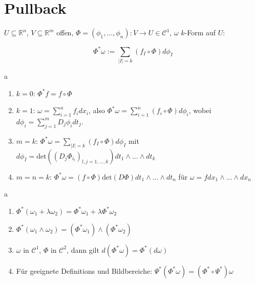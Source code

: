 \section{Pullback}
\begin{definition}[Pullback]
	$U\subseteq\mathbb R^n$, $V\subseteq\mathbb R^m$ offen, $\Phi = (\phi_1,\dots,\phi_n):V\rightarrow U \in \mathcal C^1$, $\omega$ $k$-Form auf $U$:

$$\Phi^*\omega := \sum_{|I|=k} (f_I\circ\Phi)d\phi_I$$
\end{definition}
\begin{remark}a\newline
	\begin{enumerate}
		\item $k=0$: $\Phi^*f = f\circ\Phi$
		\item $k=1$: $\omega = \sum_{i=1}^n f_i dx_i$, also $\Phi^*\omega = \sum_{i=1}^n (f_i\circ\Phi) d\phi_i$, wobei $d\phi_i = \sum_{j=1}^m D_j\phi_i dt_j$.
		\item $m=k$: $\Phi^*\omega = \sum_{|I|=k}(f_I\circ \Phi)d\phi_I$ mit $d\phi_I = \text{det}((D_j\Phi_{i_l})_{l,j=1,\dots,k})dt_1\wedge\dots\wedge dt_k$
		\item $m=n=k$: $\Phi^*\omega = (f\circ\Phi)\text{det}(D\Phi)dt_1\wedge\dots\wedge dt_n$ f\"ur $\omega = fdx_1\wedge\dots\wedge dx_n$
	\end{enumerate}
\end{remark}

\begin{theorem}a\newline
	\begin{enumerate}
		\item $\Phi^*(\omega_1+\lambda\omega_2) = \Phi^*\omega_1 + \lambda\Phi^*\omega_2$
		\item $\Phi^*(\omega_1\wedge\omega_2) = (\Phi^*\omega_1)\wedge(\Phi^*\omega_2)$
		\item $\omega$ in $\mathcal C^1$, $\Phi$ in $\mathcal C^2$, dann gilt $d(\Phi^*\omega)=\Phi^*(d\omega)$
		\item F\"ur geeignete Definitions und Bildbereiche: $\Psi^*(\Phi^*\omega)=(\Phi^*\circ\Psi^*)\omega$
	\end{enumerate}
\end{theorem}






